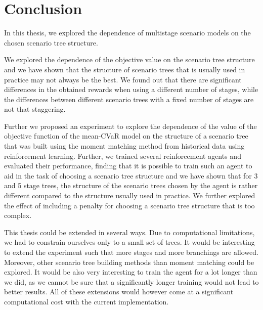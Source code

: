 \chapter*{Conclusion}
In this thesis, we explored the dependence of multistage scenario models on the chosen scenario tree structure.

We explored the dependence of the objective value on the scenario tree structure and we have shown that the structure of scenario trees that is usually used in practice may not always be the best. We found out that there are significant differences in the obtained rewards when using a different number of stages, while the differences between different scenario trees with a fixed number of stages are not that staggering.

Further we proposed an experiment to explore the dependence of the value of the objective function of the mean-CVaR model on the structure of a scenario tree that was built using the moment matching method from historical data using reinforcement learning. Further, we trained several reinforcement agents and evaluated their performance, finding that it is possible to train such an agent to aid in the task of choosing a scenario tree structure and we have shown that for 3 and 5 stage trees, the structure of the scenario trees chosen by the agent is rather different compared to the structure usually used in practice. We further explored the effect of including a penalty for choosing a scenario tree structure that is too complex. 

This thesis could be extended in several ways. Due to computational limitations, we had to constrain ourselves only to a small set of trees. It would be interesting to extend the experiment such that more stages and more branchings are allowed. Moreover, other scenario tree building methods than moment matching could be explored. It would be also very interesting to train the agent for a lot longer than we did, as we cannot be sure that a significantly longer training would not lead to better results. All of these extensions would however come at a significant computational cost with the current implementation.